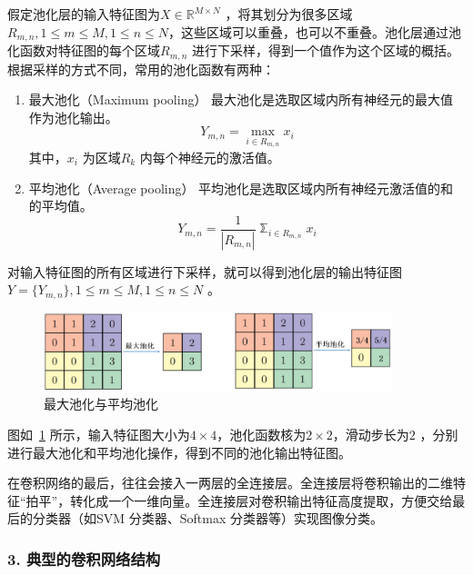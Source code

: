 假定池化层的输入特征图为$X \in \mathbb{R}^{M \times N}$ ，将其划分为很多区域$R_{m,n},1 \leq m \leq M, 1 \leq n \leq N$，这些区域可以重叠，也可以不重叠。池化层通过池化函数对特征图的每个区域$R_{m,n}$ 进行下采样，得到一个值作为这个区域的概括。根据采样的方式不同，常用的池化函数有两种：
\begin{enumerate}[1. ]
  \label{list:1}
  \item 最大池化（Maximum pooling）
        最大池化是选取区域内所有神经元的最大值作为池化输出。
        \begin{equation}
          \label{eq:2-18}
          Y_{m,n} = \mathop{\max}_{i \in R_{m,n}} x_i
        \end{equation}
        其中，$x_i$ 为区域$R_k$ 内每个神经元的激活值。

  \item 平均池化（Average pooling）
        平均池化是选取区域内所有神经元激活值的和的平均值。
        \begin{equation}
          \label{eq:2-19}
          Y_{m,n} =  \frac{1}{|R_{m,n}|}\mathbb{\sum}_{i \in R_{m,n}} x_i
        \end{equation}
\end{enumerate}
对输入特征图的所有区域进行下采样，就可以得到池化层的输出特征图$Y = \{ Y_{m,n}\},1 \leq m \leq M, 1 \leq n \leq N$ 。

\begin{figure}[htbp]
  \centering
  \includegraphics[width=0.9\textwidth]{figures/pooling}
  \caption{最大池化与平均池化}\label{fig:pooling}
\end{figure}

图如~\ref{fig:pooling} 所示，输入特征图大小为$4 \times 4$，池化函数核为$2 \times 2$，滑动步长为$2$ ，分别进行最大池化和平均池化操作，得到不同的池化输出特征图。

在卷积网络的最后，往往会接入一两层的全连接层。全连接层将卷积输出的二维特征“拍平”，转化成一个一维向量。全连接层对卷积输出特征高度提取，方便交给最后的分类器（如SVM 分类器、Softmax 分类器等）实现图像分类。

\subsubsection*{3. 典型的卷积网络结构}
\label{subsec:chap02-2-1-3}

